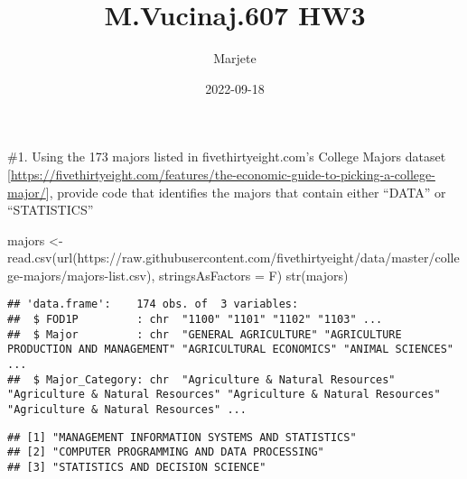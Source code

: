 \documentclass[
]{article}
\title{M.Vucinaj.607 HW3}
\author{Marjete}
\date{2022-09-18}
\newenvironment{Shaded}{\begin{snugshade}}{\end{snugshade}}
\newcommand{\AttributeTok}[1]{\textcolor[rgb]{0.77,0.63,0.00}{#1}}
\newcommand{\ConstantTok}[1]{\textcolor[rgb]{0.00,0.00,0.00}{#1}}
\newcommand{\FunctionTok}[1]{\textcolor[rgb]{0.00,0.00,0.00}{#1}}
\newcommand{\NormalTok}[1]{#1}
\newcommand{\OtherTok}[1]{\textcolor[rgb]{0.56,0.35,0.01}{#1}}
\newcommand{\SpecialCharTok}[1]{\textcolor[rgb]{0.00,0.00,0.00}{#1}}
\newcommand{\StringTok}[1]{\textcolor[rgb]{0.31,0.60,0.02}{#1}}
\begin{document}
\maketitle

\#1. Using the 173 majors listed in fivethirtyeight.com's College Majors
dataset
{[}\url{https://fivethirtyeight.com/features/the-economic-guide-to-picking-a-college-major/}{]},
provide code that identifies the majors that contain either ``DATA'' or
``STATISTICS''

\begin{Shaded}
\begin{Highlighting}[]
\NormalTok{majors }\OtherTok{\textless{}{-}} \FunctionTok{read.csv}\NormalTok{(}\FunctionTok{url}\NormalTok{(}\StringTok{\textquotesingle{}https://raw.githubusercontent.com/fivethirtyeight/data/master/college{-}majors/majors{-}list.csv\textquotesingle{}}\NormalTok{), }\AttributeTok{stringsAsFactors =}\NormalTok{ F)}
\FunctionTok{str}\NormalTok{(majors)}
\end{Highlighting}
\end{Shaded}

\begin{verbatim}
## 'data.frame':    174 obs. of  3 variables:
##  $ FOD1P         : chr  "1100" "1101" "1102" "1103" ...
##  $ Major         : chr  "GENERAL AGRICULTURE" "AGRICULTURE PRODUCTION AND MANAGEMENT" "AGRICULTURAL ECONOMICS" "ANIMAL SCIENCES" ...
##  $ Major_Category: chr  "Agriculture & Natural Resources" "Agriculture & Natural Resources" "Agriculture & Natural Resources" "Agriculture & Natural Resources" ...
\end{verbatim}

\begin{Shaded}
\end{Shaded}

\begin{verbatim}
## [1] "MANAGEMENT INFORMATION SYSTEMS AND STATISTICS"
## [2] "COMPUTER PROGRAMMING AND DATA PROCESSING"     
## [3] "STATISTICS AND DECISION SCIENCE"
\end{verbatim}

\begin{Shaded}
\end{Shaded}
\end{document}
